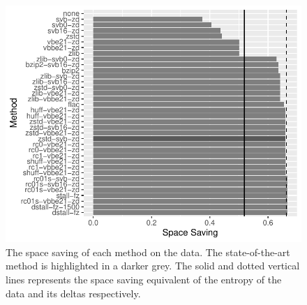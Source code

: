 \begin{figure}
\centering
%
\includegraphics[scale=0.9]{plots/reads.blow5.test.ss.bar.pdf}
\caption{\label{fig:results-ss}The space saving of each method on the
	data. The state-of-the-art method is highlighted in a darker grey.
	The solid and dotted vertical lines represents the space saving
	equivalent of the entropy of the data and its deltas respectively.}
\end{figure}
